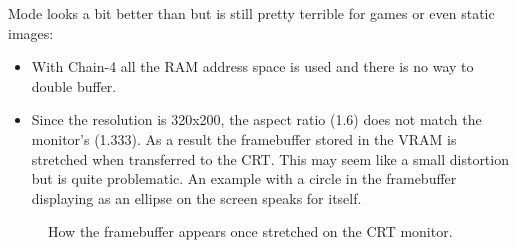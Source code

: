 \documentclass[book.tex]{subfiles}
\begin{document}
  \begin{minipage}{\textwidth}
  
  \end{minipage}
  \label{clearvga}
  \par
  Mode  looks a bit better than  but is still pretty terrible for games or even static images:\\
  \begin{itemize}
\item With Chain-4 all the RAM address space is used and there is no way to double buffer.
\item Since the resolution is 320x200, the aspect ratio (1.6) does not match the monitor's (1.333). As a result the framebuffer stored in the VRAM is stretched when transferred to the CRT. This may seem like a small distortion but is quite problematic. An example with a circle in the framebuffer displaying as an ellipse on the screen speaks for itself.
\end{itemize}

\begin{figure}[H]
  \centering
\end{figure}

\begin{figure}[H]
  \centering
  \caption{How the framebuffer appears once stretched on the CRT monitor.}
\end{figure}
\par
\end{document}
